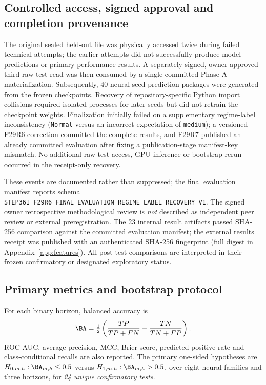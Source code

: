 \documentclass[fleqn,10pt]{wlscirep}
\begin{document}
\subsection{Controlled access, signed approval and completion provenance}
The original sealed held-out file was physically accessed twice during failed technical attempts; the earlier attempts did not successfully produce model predictions or primary performance results. A separately signed, owner-approved third raw-test read was then consumed by a single committed Phase A materialization. Subsequently, 40 neural seed prediction packages were generated from the frozen checkpoints. Recovery of repository-specific Python import collisions required isolated processes for later seeds but did not retrain the checkpoint weights. Finalization initially failed on a supplementary regime-label inconsistency (\texttt{Normal} versus an incorrect expectation of \texttt{medium}); a versioned F29R6 correction committed the complete results, and F29R7 published an already committed evaluation after fixing a publication-stage manifest-key mismatch. No additional raw-test access, GPU inference or bootstrap rerun occurred in the receipt-only recovery.

These events are documented rather than suppressed; the final evaluation manifest reports schema \texttt{STEP36I\_F29R6\_FINAL\_EVALUATION\_REGIME\_LABEL\_RECOVERY\_V1}. The signed owner retrospective methodological review is \emph{not} described as independent peer review or external preregistration. The 23 internal result artifacts passed SHA-256 comparison against the committed evaluation manifest; the external results receipt was published with an authenticated SHA-256 fingerprint (full digest in Appendix~\ref{app:features}). All post-test comparisons are interpreted in their frozen confirmatory or designated exploratory status.

\subsection{Primary metrics and bootstrap protocol}
For each binary horizon, balanced accuracy is
\begin{equation}\label{eq:ba}
\BA=\tfrac12\left(\frac{TP}{TP+FN}+\frac{TN}{TN+FP}\right).
\end{equation}
ROC-AUC, average precision, MCC, Brier score, predicted-positive rate and class-conditional recalls are also reported. The primary one-sided hypotheses are $H_{0,m,h}:\BA_{m,h}\le0.5$ versus $H_{1,m,h}:\BA_{m,h}>0.5$, over eight neural families and three horizons, for \emph{24 unique confirmatory tests}.
\end{document}
